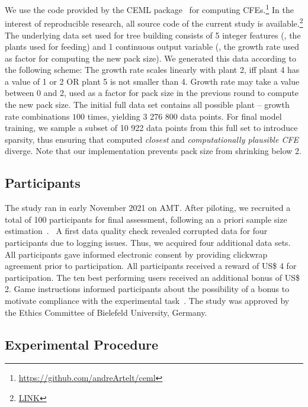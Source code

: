 We use the code provided by the CEML package~\citep{artelt_ceml_2019} for computing \glspl{CFE}.\footnote{\url{https://github.com/andreArtelt/ceml}}
In the interest of reproducible research, all source code of the current study is available.\footnote{\url{LINK}} 
The underlying data set used for tree building consists of 5 integer features (\ie, the plants used for feeding) and 1 continuous output variable (\ie, the growth rate used as factor for computing the new pack size).
We generated this data according to the following scheme: The growth rate scales linearly with plant 2, iff plant 4 has a value of 1 or 2 OR plant 5 is not smaller than 4. 
Growth rate may take a value between 0 and 2, used as a factor for pack size in the previous round to compute the new pack size.
The initial full data set contains all possible plant -- growth rate combinations $100$ times, yielding 3 276 800 data points. 
For final model training, we sample a subset of 10 922 data points from this full set to introduce sparsity, thus ensuring that computed \textit{closest} and \textit{computationally plausible \gls{CFE}} diverge.
Note that our implementation prevents pack size from shrinking below 2.

\subsection{Participants}

The study ran in early November 2021 on \gls{AMT}.
After piloting, we recruited a total of 100 participants for final assessment, following an a priori sample size estimation~\citep{kumle_estimating_2021}.%
~A first data quality check revealed corrupted data for four participants due to logging issues. 
Thus, we acquired four additional data sets. 
All participants gave informed electronic consent by providing clickwrap agreement prior to participation.
All participants received a reward of US\$ 4 for participation. 
The ten best performing users received an additional bonus of US\$ 2. 
Game instructions informed participants about the possibility of a bonus to motivate compliance with the experimental task~\citep{bansal_updates_2019}.
The study was approved by the Ethics Committee of Bielefeld University, Germany.

\subsection{Experimental Procedure}\label{subsec:experimental-procedure}

